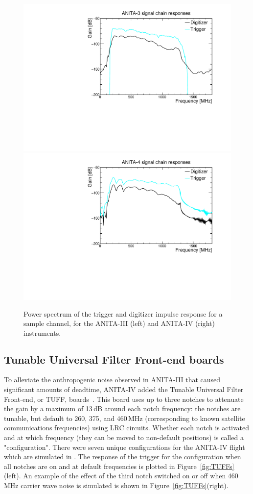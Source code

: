 \begin{figure}[!h]\centering
  \includegraphics[width=.45\linewidth]{./Figs/A3ImpulseResponses.pdf}
  \includegraphics[width=.45\linewidth]{./Figs/A4ImpulseResponses.pdf}
  \caption{Power spectrum of the trigger and digitizer impulse
    response for a sample channel, for the ANITA-III (left) and ANITA-IV (right) instruments. 
    }
  \label{fig:ANITA_ImpulseResponses}
\end{figure}


\subsection{Tunable Universal Filter Front-end boards}
\label{subsec:tuffs}
To alleviate the anthropogenic noise observed in ANITA-III that caused
significant amounts of deadtime, ANITA-IV added the Tunable Universal
Filter Front-end, or TUFF, boards~\cite{Allison:2017vtk}.
This board uses up to three notches to attenuate
the gain by a maximum of 13\,dB around each notch
frequency:
the notches are tunable, but default to 260, 375, and 460\,MHz  (corresponding to known satellite communications frequencies) using LRC circuits. 
Whether each notch is activated and at which frequency (they
can be moved to non-default positions) is called
a "configuration".
There were seven unique configurations for the ANITA-IV flight  which are simulated in 
\icemc. 
The response of the trigger for the configuration when all notches are on and at default frequencies is plotted in Figure~\ref{fig:TUFFs}(left). 
An example of the effect of the third notch switched on or off when 460\,MHz carrier wave noise is simulated is shown in Figure~\ref{fig:TUFFs}(right).

